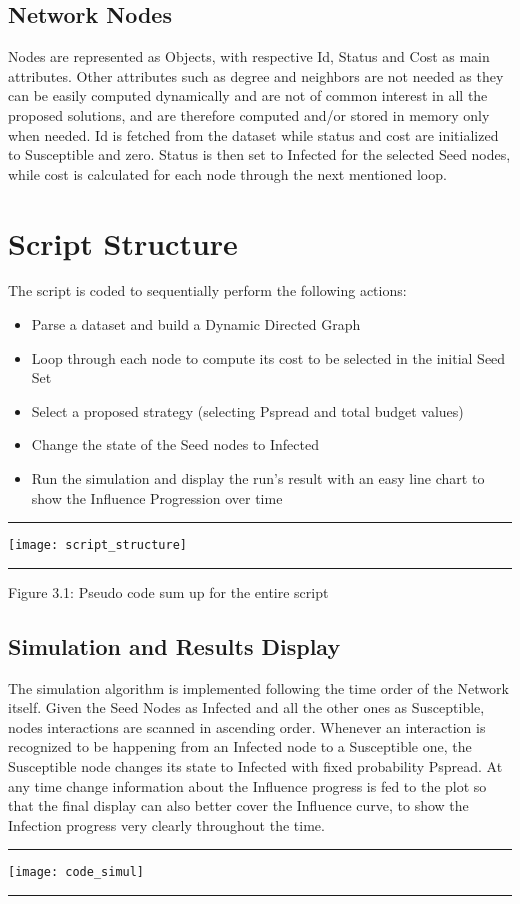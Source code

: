 \subsection{Network Nodes}
\label{sec:nodes}
Nodes are represented as Objects, with respective Id, Status and Cost as main attributes. Other attributes such as degree and neighbors are not needed as they can be easily computed dynamically and are not of common interest in all the proposed solutions, and are therefore computed and/or stored in memory only when needed. Id is fetched from the dataset while status and cost are initialized to Susceptible and zero. Status is then set to Infected for the selected Seed nodes, while cost is calculated for each node through the next mentioned loop.

\section{Script Structure}
\label{sec:script}
The script is coded to sequentially perform the following actions:
\begin{itemize}
\item Parse a dataset and build a Dynamic Directed Graph
\item Loop through each node to compute its cost to be selected in the initial Seed Set
\item Select a proposed strategy (selecting Pspread and total budget values)
\item Change the state of the Seed nodes to Infected
\item Run the simulation and display the run's result with an easy line chart to show the Influence Progression over time

\end{itemize} 
\hrule 
\texttt{[image: script\_structure]}
\hrule

\begin{center}
    Figure 3.1: Pseudo code sum up for the entire script
\end{center}

\subsection{Simulation and Results Display}
\label{sec:run}
The simulation algorithm is implemented following the time order of the Network itself. Given the Seed Nodes as Infected and all the other ones as Susceptible, nodes interactions are scanned in ascending order. Whenever an interaction is recognized to be happening from an Infected node to a Susceptible one, the Susceptible node changes its state to Infected with fixed probability Pspread. At any time change information about the Influence progress is fed to the plot so that the final display can also better cover the Influence curve, to show the Infection progress very clearly throughout the time.
\\
\hrule 
\texttt{[image: code\_simul]}
\hrule

